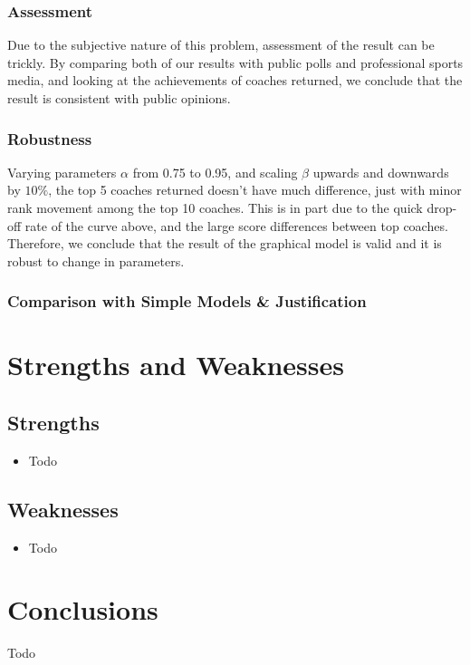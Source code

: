 \documentclass[titlepage]{article}
\begin{document}
\subsubsection*{Assessment}

\noindent Due to the subjective nature of this problem, assessment of the result can be trickly. By comparing both of our results with public polls and professional sports media, and looking at the achievements of coaches returned, we conclude that the result is consistent with public opinions.

\subsubsection*{Robustness}

\noindent Varying parameters $\alpha$ from 0.75 to 0.95, and scaling $\beta$ upwards and downwards by $10\%$, the top 5 coaches returned doesn't have much difference, just with minor rank movement among the top 10 coaches. This is in part due to the quick drop-off rate of the curve above, and the large score differences between top coaches. Therefore, we conclude that the result of the graphical model is valid and it is robust to change in parameters.

\subsubsection*{Comparison with Simple Models \& Justification}

\section{Strengths and Weaknesses}
\subsection{Strengths}
\begin{itemize}
\item Todo
\end{itemize}
\subsection{Weaknesses}
\begin{itemize}
\item Todo
\end{itemize}

\section{Conclusions}
Todo
\end{document}
